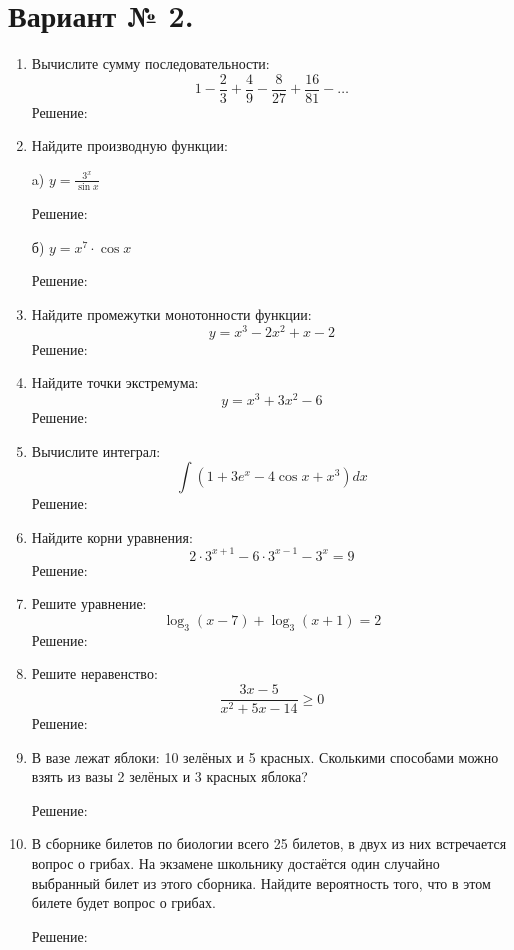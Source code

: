 \documentclass{article}
\begin{document}
\section*{Вариант № 2.}
\begin{enumerate}

\item %
Вычислите сумму последовательности:
$$1-\frac{2}{3}+\frac{4}{9}-\frac{8}{27}+\frac{16}{81}-\ldots$$
Решение:


\item %
Найдите производную функции:

a) $y=\frac{3^x}{\sin{x}}$

Решение:



б) $y=x^{7}\cdot\cos{x}$

Решение:



\item %
Найдите промежутки монотонности функции:
$$y=x^3-2x^2+x-2$$
Решение:


\item %
Найдите точки экстремума:
$$y=x^3+3x^2-6$$
Решение:


\item %
Вычислите интеграл:
$$\int{\left(1+3e^x-4\cos{x}+x^3\right)dx}$$
Решение:



\item %
Найдите корни уравнения:
$$2\cdot3^{x+1}-6\cdot3^{x-1}-3^x=9$$
Решение:



\item %
Решите уравнение:
$$\log_3{(x-7)}+\log_3{(x+1)}=2$$
Решение:



\item %
Решите неравенство:
$$\frac{3x-5}{x^2+5x-14}\geq0$$
Решение:



\item %
В вазе лежат яблоки: 10 зелёных и 5 красных. Сколькими способами можно взять из вазы 2 зелёных и 3 красных яблока?

Решение:



\item %
В сборнике билетов по биологии всего 25 билетов, в двух из них встречается вопрос о грибах. На экзамене школьнику достаётся один случайно выбранный билет из этого сборника. Найдите вероятность того, что в этом билете будет вопрос о грибах.

Решение:



\end{enumerate}
\end{document}
